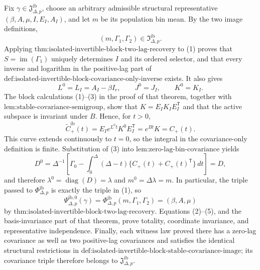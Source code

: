 Fix \(\gamma\in\mathfrak J_{\Delta,p}^{\mathrm{ib}}\), choose an arbitrary admissible structural representative \((\beta,A,\mu,I,E_I,A_I)\), and let \(m\) be its population bin mean.  By the two image definitions,
\[
 (m,\Gamma_1,\Gamma_2)\in\mathfrak I_{\Delta,p}^{\mathrm{ib}}.
\tag{1}
\]
Applying \(\text{thm:isolated-invertible-block-two-lag-recovery}\) to (1) proves that \(S=\operatorname{im}(\Gamma_1)\) uniquely determines \(I\) and its ordered selector, and that every inverse and logarithm in the positive-lag part of \(\text{def:isolated-invertible-block-covariance-only-inverse}\) exists.  It also gives
\[
 L^0=L_I=A_I-\beta I_r,\qquad J^0=J_I,\qquad K^0=K_I.
\tag{2}
\]
The block calculations (1)--(3) in the proof of that theorem, together with \(\text{lem:stable-covariance-semigroup}\), show that \(K=E_IK_IE_I^{\mathsf T}\) and that the active subspace is invariant under \(B\).  Hence, for \(t>0\),
\[
 \widetilde C_{+}^{\mathrm{ib}}(t)
 =E_Ie^{L^0t}K^0E_I^{\mathsf T}
 =e^{Bt}K=C_{+}(t).
\tag{3}
\]
This curve extends continuously to \(t=0\), so the integral in the covariance-only definition is finite.  Substitution of (3) into \(\text{lem:zero-lag-bin-covariance}\) yields
\[
 D^0=\Delta^{-1}\!\left[\Gamma_0-
 \int_0^\Delta(\Delta-t)\{C_{+}(t)+C_{+}(t)^{\mathsf T}\}\,dt\right]
 =D,
\tag{4}
\]
and therefore \(\lambda^0=\operatorname{diag}(D)=\lambda\) and \(m^0=\Delta\lambda=m\).  In particular, the triple passed to \(\Phi_{\Delta,p}^{\mathrm{ib}}\) is exactly the triple in (1), so
\[
 \Psi_{\Delta,p}^{\mathrm{ib},0}(\gamma)
 =\Phi_{\Delta,p}^{\mathrm{ib}}(m,\Gamma_1,\Gamma_2)
 =(\beta,A,\mu)
\tag{5}
\]
by \(\text{thm:isolated-invertible-block-two-lag-recovery}\).  Equations (2)--(5), and the basis-invariance part of that theorem, prove totality, coordinate invariance, and representative independence.  Finally, each witness law proved there has a zero-lag covariance as well as two positive-lag covariances and satisfies the identical structural restrictions in \(\text{def:isolated-invertible-block-stable-covariance-image}\); its covariance triple therefore belongs to \(\mathfrak J_{\Delta,p}^{\mathrm{ib}}\).